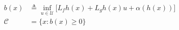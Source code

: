 \documentclass[preview]{standalone}
\begin{document}
\begin{align*}
b(x) &\triangleq \inf_{u \in \mathcal{U}} \big [ L_fh(x) + L_gh(x) u + \alpha(h(x)) \big]\\ \mathcal{C} &= \{ x : b(x) \geq 0 \}
\end{align*}
\end{document}
